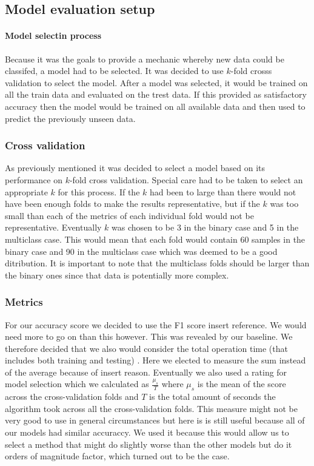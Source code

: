 \documentclass[british]{article}
\begin{document}
\subsection{Model evaluation setup}
\paragraph{Model selectin process} Because it was the goals to provide a mechanic whereby new data could be classifed, a model had to be selected. It was decided to use $k$-fold crosss validation to select the model. After a model was selected, it would be trained on all the train data and evaluated on the trest data. If this provided as satisfactory accuracy then the model would be trained on all available data and then used to predict the previously unseen data. 

\subsubsection{Cross validation} As previously mentioned it was decided to select a model based on its performance on $k$-fold cross validation. Special care had to be taken to select an appropriate $k$ for this process. If the $k$ had been to large than there would not have been enough folds to make the results representative, but if the $k$ was too small than each of the metrics of each individual fold would not be representative. Eventually $k$ was chosen to be 3 in the binary case and 5 in the multiclass case. This would mean that each fold would contain 60 samples in the binary case and 90 in the multiclass case which was deemed to be a good ditribution. It is important to note that the multiclass folds should be larger than the binary ones since that data is potentially more complex. 

\subsubsection{Metrics}
For our accuracy score we decided to use the F1 score {\color{red} insert reference}. We would need more to go on than this however. This was revealed by our baseline. We therefore decided that we also would consider the total operation time (that includes both training and testing) . Here we elected to measure the sum instead of the average because of {\color{red} insert reason}. Eventually we also used a rating for model selection which we calculated as $\frac{\mu_s}{T}$ where $\mu_s$ is the mean of the score across the cross-validation folds and $T$ is the total amount of seconds the algorithm took across all the cross-validation folds. This measure might not be very good to use in general circumstances but here is is still useful because all of our models had similar accuraccy. We used it because this would allow us to select a method that might do slightly worse than the other models but do it orders of magnitude factor, which turned out to be the case. 
\end{document}
